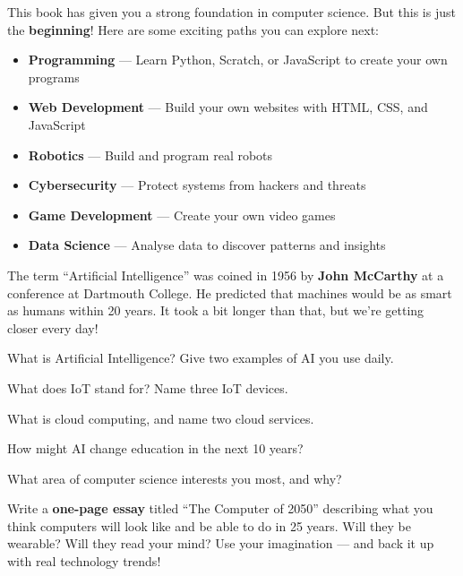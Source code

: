 This book has given you a strong foundation in computer science. But this is just the \textbf{beginning}! Here are some exciting paths you can explore next:

\begin{itemize}[leftmargin=*, label={\textcolor{ModuleBlue}{\faRocket}}, itemsep=4pt]
  \item \textbf{Programming} --- Learn Python, Scratch, or JavaScript to create your own programs
  \item \textbf{Web Development} --- Build your own websites with HTML, CSS, and JavaScript
  \item \textbf{Robotics} --- Build and program real robots
  \item \textbf{Cybersecurity} --- Protect systems from hackers and threats
  \item \textbf{Game Development} --- Create your own video games
  \item \textbf{Data Science} --- Analyse data to discover patterns and insights
\end{itemize}


\begin{funfact}
The term ``Artificial Intelligence'' was coined in 1956 by \textbf{John McCarthy} at a conference at Dartmouth College. He predicted that machines would be as smart as humans within 20 years. It took a bit longer than that, but we're getting closer every day!
\end{funfact}

\begin{reviewqs}
  \item What is Artificial Intelligence? Give two examples of AI you use daily.
  \item What does IoT stand for? Name three IoT devices.
  \item What is cloud computing, and name two cloud services.
  \item How might AI change education in the next 10 years?
  \item What area of computer science interests you most, and why?
\end{reviewqs}

\begin{challenge}
Write a \textbf{one-page essay} titled ``The Computer of 2050'' describing what you think computers will look like and be able to do in 25 years. Will they be wearable? Will they read your mind? Use your imagination --- and back it up with real technology trends!
\end{challenge}

